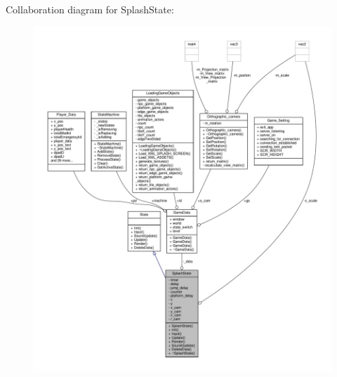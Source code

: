Collaboration diagram for Splash\+State\+:
\nopagebreak
\begin{figure}[H]
\begin{center}
\leavevmode
\includegraphics[width=350pt]{classSplashState__coll__graph}
\end{center}
\end{figure}
